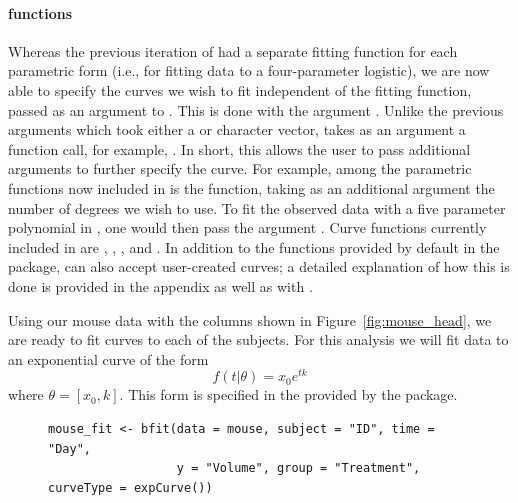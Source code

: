 \paragraph{ functions} Whereas the previous iteration of  had a separate fitting function for each parametric form (i.e.,  for fitting data to a four-parameter logistic), we are now able to specify the curves we wish to fit independent of the fitting function, passed as an argument to . This is done with the argument . Unlike the previous arguments which took either a  or character  vector,  takes as an argument a function call, for example, . In short, this allows the user to pass additional arguments to further specify the curve. For example, among the parametric functions now included in  is the  function, taking as an additional argument the number of degrees we wish to use. To fit the observed data with a five parameter polynomial in , one would then pass the argument . Curve functions currently included in  are , , , and . In addition to the functions provided by default in the  package,  can also accept user-created curves; a detailed explanation of how this is done is provided in the appendix as well as with .

Using our mouse data with the columns shown in Figure~\ref{fig:mouse_head}, we are ready to fit curves to each of the subjects. For this analysis we will fit data to an exponential curve of the form
\begin{equation}
f(t|\theta) = x_0 e^{tk}
\end{equation}
where $\theta = [x_0, k]$. This form is specified in the  provided by the  package.


\begin{singlespace}
\begin{figure}[H]
\centering
\begin{BVerbatim}
mouse_fit <- bfit(data = mouse, subject = "ID", time = "Day", 
                  y = "Volume", group = "Treatment", curveType = expCurve())
\end{BVerbatim}
\label{fig:bfit_example}
\end{figure}
\end{singlespace}

